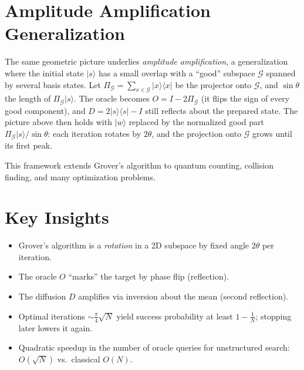 \documentclass[a4paper,11pt]{article}
\providecommand{\ket}[1]{|{#1}\rangle}
\providecommand{\bra}[1]{\langle{#1}|}
\begin{document}
\section*{Amplitude Amplification Generalization}

The same geometric picture underlies \emph{amplitude amplification}, a generalization where the initial state $\ket{s}$ has a small overlap with a ``good'' subspace $\mathcal{G}$ spanned by several basis states. Let $\Pi_{\mathcal{G}} = \sum_{x\in\mathcal{G}}\ket{x}\bra{x}$ be the projector onto $\mathcal{G}$, and $\sin\theta$ the length of $\Pi_{\mathcal{G}}\ket{s}$. The oracle becomes $O = I - 2\Pi_{\mathcal{G}}$ (it flips the sign of every good component), and $D = 2\ket{s}\bra{s}-I$ still reflects about the prepared state. The picture above then holds with $\ket{w}$ replaced by the normalized good part $\Pi_{\mathcal{G}}\ket{s}/\sin\theta$: each iteration rotates by $2\theta$, and the projection onto $\mathcal{G}$ grows until its first peak.

This framework extends Grover's algorithm to quantum counting, collision finding, and many optimization problems.

\section*{Key Insights}

\begin{itemize}
  \item Grover's algorithm is a \emph{rotation} in a 2D subspace by fixed angle $2\theta$ per iteration.
  \item The oracle $O$ ``marks'' the target by phase flip (reflection).
  \item The diffusion $D$ amplifies via inversion about the mean (second reflection).
  \item Optimal iterations $\sim\frac{\pi}{4}\sqrt{N}$ yield success probability at least $1-\frac{1}{N}$; stopping later lowers it again.
  \item Quadratic speedup in the number of oracle queries for unstructured search: $O(\sqrt{N})$ vs.\ classical $O(N)$.
\end{itemize}
\end{document}
